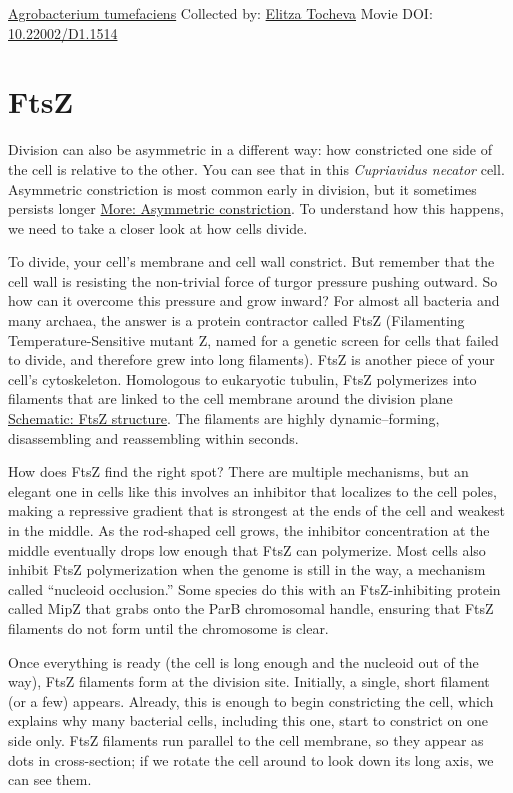 \documentclass[]{tufte-book}
\begin{document}
\hypertarget{htmlwidget-c537ac0a908b9b1f150e}{}

\label{fig:5-8}\protect\hyperlink{tree}{Agrobacterium tumefaciens} Collected by: \protect\hyperlink{elitza_tocheva}{Elitza Tocheva} Movie DOI: \href{https://doi.org/10.22002/D1.1514}{10.22002/D1.1514}

\hypertarget{ftsz}{%
\section{FtsZ}\label{ftsz}}

Division can also be asymmetric in a different way: how constricted one side of the cell is relative to the other. You can see that in this \emph{Cupriavidus necator} cell. Asymmetric constriction is most common early in division, but it sometimes persists longer \protect\hyperlink{Asymmetric_constriction}{More: Asymmetric constriction}. To understand how this happens, we need to take a closer look at how cells divide.

To divide, your cell's membrane and cell wall constrict. But remember that the cell wall is resisting the non-trivial force of turgor pressure pushing outward. So how can it overcome this pressure and grow inward? For almost all bacteria and many archaea, the answer is a protein contractor called FtsZ (Filamenting Temperature-Sensitive mutant Z, named for a genetic screen for cells that failed to divide, and therefore grew into long filaments). FtsZ is another piece of your cell's cytoskeleton. Homologous to eukaryotic tubulin, FtsZ polymerizes into filaments that are linked to the cell membrane around the division plane \protect\hyperlink{FtsZ_structure}{Schematic: FtsZ structure}. The filaments are highly dynamic--forming, disassembling and reassembling within seconds.

How does FtsZ find the right spot? There are multiple mechanisms, but an elegant one in cells like this involves an inhibitor that localizes to the cell poles, making a repressive gradient that is strongest at the ends of the cell and weakest in the middle. As the rod-shaped cell grows, the inhibitor concentration at the middle eventually drops low enough that FtsZ can polymerize. Most cells also inhibit FtsZ polymerization when the genome is still in the way, a mechanism called ``nucleoid occlusion.'' Some species do this with an FtsZ-inhibiting protein called MipZ that grabs onto the ParB chromosomal handle, ensuring that FtsZ filaments do not form until the chromosome is clear.

Once everything is ready (the cell is long enough and the nucleoid out of the way), FtsZ filaments form at the division site. Initially, a single, short filament (or a few) appears. Already, this is enough to begin constricting the cell, which explains why many bacterial cells, including this one, start to constrict on one side only. FtsZ filaments run parallel to the cell membrane, so they appear as dots in cross-section; if we rotate the cell around to look down its long axis, we can see them.
\end{document}
